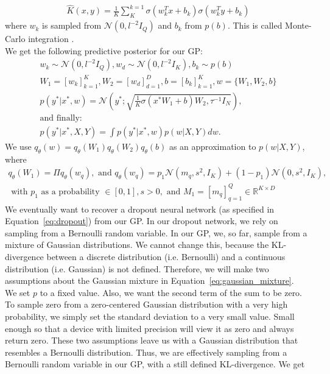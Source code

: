\documentclass[a4paper,cleardoubleempty,BCOR1cm, 11pt]{report}
\begin{document}
\begin{align*}
	\hat{K}(x,y) = \frac{1}{K} \sum_{K}^{k=1} \sigma(w^T_k x + b_k)\sigma(w^T_k y + b_k)
\end{align*}
where $w_k$ is sampled from $\mathcal{N}(0, l^{-2}I_Q)$ and $b_k$ from $p(b)$. This is called Monte-Carlo integration \cite{metropolis1949monte}.\\
We get the following predictive posterior for our GP:
\begin{align*}
w_k \sim \mathcal{N}(0, l^{-2}I_Q), w_d \sim \mathcal{N}(0, l^{-2} I_K), b_k \sim p(b)\\
W_1 = \left[ w_k \right]^{K}_{k=1}, W_2 = \left[ w_d \right]^D_{d=1}, b = \left[ b_k \right]^K_{k=1}, w = \lbrace W_1, W_2, b \rbrace\\
p(y^*|x^*, w) = \mathcal{N} \left( y^*; \sqrt{\frac{1}{K}\sigma(x^* W_1 + b)W_2, \tau^{-1}I_N}\right),\\
\text{and finally:}\hspace{160pt}\\
p(y^*|x^*, X,Y) = \int p(y^*|x^*, w)p(w|X,Y)dw.
\end{align*}
We use $q_{\theta}(w) = q_{\theta}(W_1)q_{\theta}(W_2)q_{\theta}(b)$ as an approximation to $p(w|X,Y)$, where
\begin{align*}\label{eq:gaussian_mixture}
q_{\theta}(W_1) = \Pi q_{\theta}(w_q), \text{ and } q_{\theta}(w_q) = p_1\mathcal{N}(m_q, s^2, I_K) + (1-p_1) \mathcal{N}(0, s^2, I_K),\\
\text{ with } p_1 \text{ as a probability }\in \left[ 0, 1\right], s > 0, \text{ and }M_1 = \left[ m_q \right]^Q_{q=1} \in \mathbb{R}^{K\times D}
\end{align*}
We eventually want to recover a dropout neural network (as specified in Equation~\ref{eq:dropout}) from our GP. In our dropout network, we rely on sampling from a Bernoulli random variable. In our GP, we, so far, sample from a mixture of Gaussian distributions. We cannot change this, because the KL-divergence between a discrete distribution (i.e. Bernoulli) and a continuous distribution (i.e. Gaussian) is not defined. Therefore, we will make two assumptions about the Gaussian mixture in Equation~\ref{eq:gaussian_mixture}.\\
We set $p$ to a fixed value. Also, we want the second term of the sum to be zero. To sample zero from a zero-centered Gaussian distribution with a very high probability, we simply set the standard deviation to a very small value. Small enough so that a device with limited precision will view it as zero and always return zero. These two assumptions leave us with a Gaussian distribution that resembles a Bernoulli distribution. Thus, we are effectively sampling from a Bernoulli random variable in our GP, with a still defined KL-divergence. We get
\end{document}
